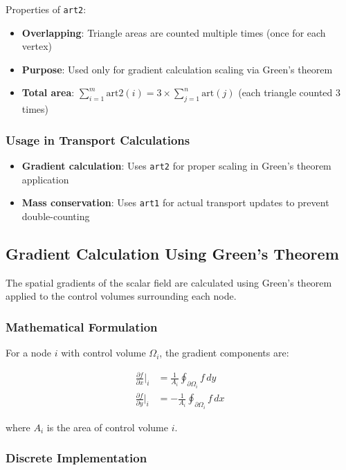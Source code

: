 \documentclass[11pt,a4paper]{article}
\begin{document}
Properties of \texttt{art2}:
\begin{itemize}
\item \textbf{Overlapping}: Triangle areas are counted multiple times (once for each vertex)
\item \textbf{Purpose}: Used only for gradient calculation scaling via Green's theorem
\item \textbf{Total area}: $\sum_{i=1}^{m} \text{art2}(i) = 3 \times \sum_{j=1}^{n} \text{art}(j)$ (each triangle counted 3 times)
\end{itemize}

\subsubsection{Usage in Transport Calculations}

\begin{itemize}
\item \textbf{Gradient calculation}: Uses \texttt{art2} for proper scaling in Green's theorem application
\item \textbf{Mass conservation}: Uses \texttt{art1} for actual transport updates to prevent double-counting
\end{itemize}

\subsection{Gradient Calculation Using Green's Theorem}

The spatial gradients of the scalar field are calculated using Green's theorem applied to the control volumes surrounding each node.

\subsubsection{Mathematical Formulation}

For a node $i$ with control volume $\Omega_i$, the gradient components are:

\begin{align}
\frac{\partial f}{\partial x}\bigg|_i &= \frac{1}{A_i} \oint_{\partial \Omega_i} f \, dy \\
\frac{\partial f}{\partial y}\bigg|_i &= -\frac{1}{A_i} \oint_{\partial \Omega_i} f \, dx
\end{align}

where $A_i$ is the area of control volume $i$.

\subsubsection{Discrete Implementation}
\end{document}

